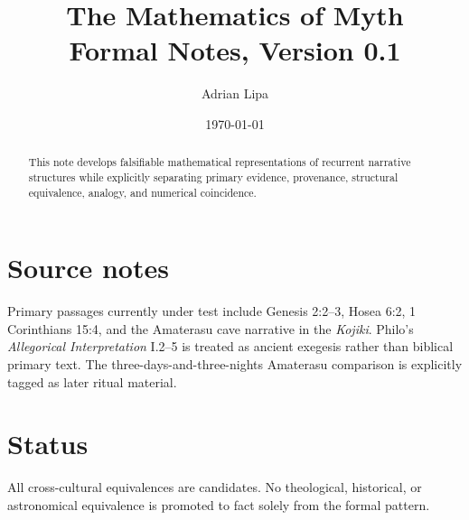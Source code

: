\documentclass[11pt]{article}
\title{The Mathematics of Myth\\\large Formal Notes, Version 0.1}
\author{Adrian Lipa}
\date{\today}
\begin{document}
\maketitle

\begin{abstract}
This note develops falsifiable mathematical representations of recurrent
narrative structures while explicitly separating primary evidence,
provenance, structural equivalence, analogy, and numerical coincidence.
\end{abstract}








\section{Source notes}
Primary passages currently under test include Genesis 2:2--3, Hosea 6:2,
1 Corinthians 15:4, and the Amaterasu cave narrative in the \emph{Kojiki}.
Philo's \emph{Allegorical Interpretation} I.2--5 is treated as ancient
exegesis rather than biblical primary text.  The three-days-and-three-nights
Amaterasu comparison is explicitly tagged as later ritual material.

\section{Status}
All cross-cultural equivalences are candidates.  No theological,
historical, or astronomical equivalence is promoted to fact solely from the
formal pattern.
\end{document}
